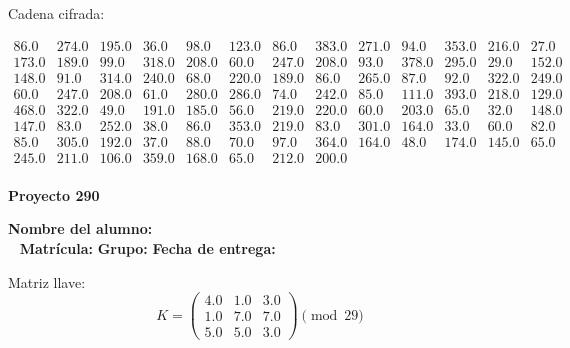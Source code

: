 \documentclass[12pt]{article}
\begin{document}
Cadena cifrada:
\begin{center}
$\begin{array}{lllllllllllll}
86.0 & 274.0 & 195.0 & 36.0 & 98.0 & 123.0 & 86.0 & 383.0 & 271.0 & 94.0 & 353.0 & 216.0 & 27.0\\
173.0 & 189.0 & 99.0 & 318.0 & 208.0 & 60.0 & 247.0 & 208.0 & 93.0 & 378.0 & 295.0 & 29.0 & 152.0\\
148.0 & 91.0 & 314.0 & 240.0 & 68.0 & 220.0 & 189.0 & 86.0 & 265.0 & 87.0 & 92.0 & 322.0 & 249.0\\
60.0 & 247.0 & 208.0 & 61.0 & 280.0 & 286.0 & 74.0 & 242.0 & 85.0 & 111.0 & 393.0 & 218.0 & 129.0\\
468.0 & 322.0 & 49.0 & 191.0 & 185.0 & 56.0 & 219.0 & 220.0 & 60.0 & 203.0 & 65.0 & 32.0 & 148.0\\
147.0 & 83.0 & 252.0 & 38.0 & 86.0 & 353.0 & 219.0 & 83.0 & 301.0 & 164.0 & 33.0 & 60.0 & 82.0\\
85.0 & 305.0 & 192.0 & 37.0 & 88.0 & 70.0 & 97.0 & 364.0 & 164.0 & 48.0 & 174.0 & 145.0 & 65.0\\
245.0 & 211.0 & 106.0 & 359.0 & 168.0 & 65.0 & 212.0 & 200.0\\
\end{array}$
\end{center}

\newpage


\textbf{Proyecto 290}

\textbf{Nombre del alumno:} \underline{\hspace{13cm}}\\\
\vspace{1cm}
\textbf{Matrícula:} \underline{\hspace{4cm}} \hspace{1cm}
\textbf{Grupo:} \underline{\hspace{2cm}}
\textbf{Fecha de entrega:} \underline{\hspace{2cm}}

\medskip

Matriz llave:
\[
K = \begin{pmatrix}
4.0 & 1.0 & 3.0\\
1.0 & 7.0 & 7.0\\
5.0 & 5.0 & 3.0
\end{pmatrix} \pmod{29}
\]
\end{document}
